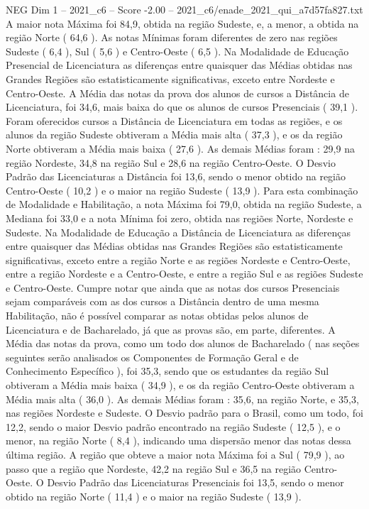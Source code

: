 \begin{textsample}{NEG Dim 1 – 2021\_c6 – Score -2.00 – 2021\_c6/enade\_2021\_qui\_a7d57fa827.txt}
A maior nota Máxima foi 84,9, obtida na região Sudeste, e, a menor, a obtida na região Norte ( 64,6 ).
As notas Mínimas foram diferentes de zero nas regiões Sudeste ( 6,4 ), Sul ( 5,6 ) e Centro-Oeste ( 6,5 ).
Na Modalidade de Educação Presencial de Licenciatura as diferenças entre quaisquer das Médias obtidas nas Grandes Regiões são estatisticamente significativas, exceto entre Nordeste e Centro-Oeste.
A Média das notas da prova dos alunos de cursos a Distância de Licenciatura, foi 34,6, mais baixa do que os alunos de cursos Presenciais ( 39,1 ).
Foram oferecidos cursos a Distância de Licenciatura em todas as regiões, e os alunos da região Sudeste obtiveram a Média mais alta ( 37,3 ), e os da região Norte obtiveram a Média mais baixa ( 27,6 ).
As demais Médias foram : 29,9 na região Nordeste, 34,8 na região Sul e 28,6 na região Centro-Oeste.
O Desvio Padrão das Licenciaturas a Distância foi 13,6, sendo o menor obtido na região Centro-Oeste ( 10,2 ) e o maior na região Sudeste ( 13,9 ).
Para esta combinação de Modalidade e Habilitação, a nota Máxima foi 79,0, obtida na região Sudeste, a Mediana foi 33,0 e a nota Mínima foi zero, obtida nas regiões Norte, Nordeste e Sudeste.
Na Modalidade de Educação a Distância de Licenciatura as diferenças entre quaisquer das Médias obtidas nas Grandes Regiões são estatisticamente significativas, exceto entre a região Norte e as regiões Nordeste e Centro-Oeste, entre a região Nordeste e a Centro-Oeste, e entre a região Sul e as regiões Sudeste e Centro-Oeste.
Cumpre notar que ainda que as notas dos cursos Presenciais sejam comparáveis com as dos cursos a Distância dentro de uma mesma Habilitação, não é possível comparar as notas obtidas pelos alunos de Licenciatura e de Bacharelado, já que as provas são, em parte, diferentes.
A Média das notas da prova, como um todo dos alunos de Bacharelado ( nas seções seguintes serão analisados os Componentes de Formação Geral e de Conhecimento Específico ), foi 35,3, sendo que os estudantes da região Sul obtiveram a Média mais baixa ( 34,9 ), e os da região Centro-Oeste obtiveram a Média mais alta ( 36,0 ).
As demais Médias foram : 35,6, na região Norte, e 35,3, nas regiões Nordeste e Sudeste.
O Desvio padrão para o Brasil, como um todo, foi 12,2, sendo o maior Desvio padrão encontrado na região Sudeste ( 12,5 ), e o menor, na região Norte ( 8,4 ), indicando uma dispersão menor das notas dessa última região.
A região que obteve a maior nota Máxima foi a Sul ( 79,9 ), ao passo que a região que Nordeste, 42,2 na região Sul e 36,5 na região Centro-Oeste.
O Desvio Padrão das Licenciaturas Presenciais foi 13,5, sendo o menor obtido na região Norte ( 11,4 ) e o maior na região Sudeste ( 13,9 ).

\end{textsample}
